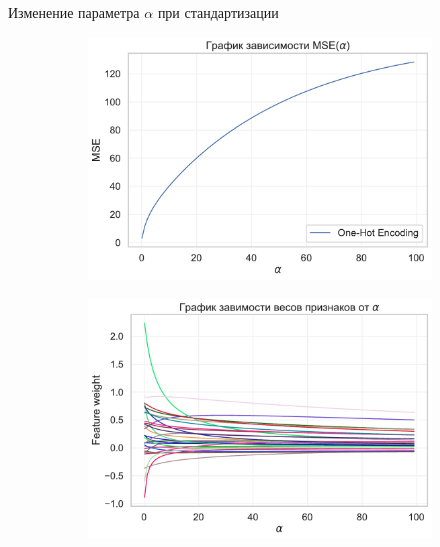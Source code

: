 \documentclass{beamer} %
\begin{document}
    \begin{frame}{Изменение параметра $\alpha$ при стандартизации}
        \begin{figure}
            \centering
            \begin{subfigure}[b]{0.475\textwidth}
                \centering
                \includegraphics[width=\textwidth]{MSE_plot_oh_scaled_1.pdf}
            \end{subfigure}
            \hfill
            \begin{subfigure}[b]{0.475\textwidth}  
                \centering 
                \includegraphics[width=\textwidth]{feature_plot_oh_scaled_1.pdf}
            \end{subfigure}
            \begin{subfigure}[b]{0.475\textwidth}   
                \centering 

\end{subfigure}
\end{figure}
\end{frame}
\end{document}
